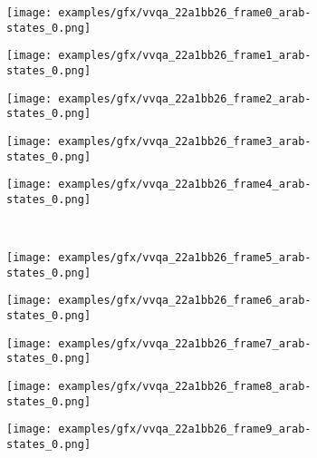 \begin{figure}[H]
\begin{tcolorbox}[colback=gray!5!white,colframe=black!75!black,fonttitle=\bfseries\scriptsize,fontupper=\ttfamily\footnotesize,segmentation style={solid, black!30}]
  \begin{center}
    \begin{minipage}{0.18\linewidth}
      \centering
      \texttt{[image: examples/gfx/vvqa\_22a1bb26\_frame0\_arab-states\_0.png]}
    \end{minipage}\hfill
    \begin{minipage}{0.18\linewidth}
      \centering
      \texttt{[image: examples/gfx/vvqa\_22a1bb26\_frame1\_arab-states\_0.png]}
    \end{minipage}\hfill
    \begin{minipage}{0.18\linewidth}
      \centering
      \texttt{[image: examples/gfx/vvqa\_22a1bb26\_frame2\_arab-states\_0.png]}
    \end{minipage}\hfill
    \begin{minipage}{0.18\linewidth}
      \centering
      \texttt{[image: examples/gfx/vvqa\_22a1bb26\_frame3\_arab-states\_0.png]}
    \end{minipage}\hfill
    \begin{minipage}{0.18\linewidth}
      \centering
      \texttt{[image: examples/gfx/vvqa\_22a1bb26\_frame4\_arab-states\_0.png]}
    \end{minipage}\hfill
  \\[4mm]
    \begin{minipage}{0.18\linewidth}
      \centering
      \texttt{[image: examples/gfx/vvqa\_22a1bb26\_frame5\_arab-states\_0.png]}
    \end{minipage}\hfill
    \begin{minipage}{0.18\linewidth}
      \centering
      \texttt{[image: examples/gfx/vvqa\_22a1bb26\_frame6\_arab-states\_0.png]}
    \end{minipage}\hfill
    \begin{minipage}{0.18\linewidth}
      \centering
      \texttt{[image: examples/gfx/vvqa\_22a1bb26\_frame7\_arab-states\_0.png]}
    \end{minipage}\hfill
    \begin{minipage}{0.18\linewidth}
      \centering
      \texttt{[image: examples/gfx/vvqa\_22a1bb26\_frame8\_arab-states\_0.png]}
    \end{minipage}\hfill
    \begin{minipage}{0.18\linewidth}
      \centering
      \texttt{[image: examples/gfx/vvqa\_22a1bb26\_frame9\_arab-states\_0.png]}
    \end{minipage}\hfill
  \end{center}


\end{tcolorbox}
\end{figure}
